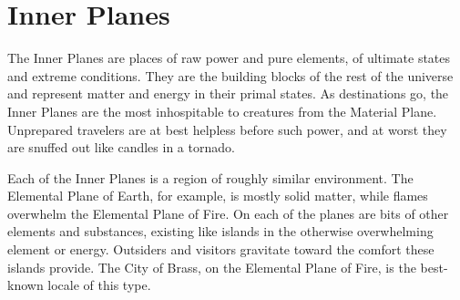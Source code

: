 \section{Inner Planes}
The Inner Planes are places of raw power and pure elements, of ultimate states and extreme conditions. They are the building blocks of the rest of the universe and represent matter and energy in their primal states. As destinations go, the Inner Planes are the most inhospitable to creatures from the Material Plane. Unprepared travelers are at best helpless before such power, and at worst they are snuffed out like candles in a tornado.

Each of the Inner Planes is a region of roughly similar environment. The Elemental Plane of Earth, for example, is mostly solid matter, while flames overwhelm the Elemental Plane of Fire. On each of the planes are bits of other elements and substances, existing like islands in the otherwise overwhelming element or energy. Outsiders and visitors gravitate toward the comfort these islands provide. The City of Brass, on the Elemental Plane of Fire, is the best-known locale of this type.

